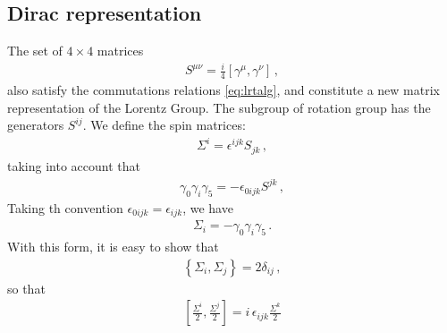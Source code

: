 \begin{inprogress}
  \subsection{Dirac representation}
The set of $4\times 4$ matrices
\begin{align}
  S^{\mu\nu}=\frac{i}{4}\left[\gamma^\mu,\gamma^\nu\right]\,,
\end{align}
also satisfy the commutations relations \eqref{eq:lrtalg}, and constitute a new matrix representation of the Lorentz Group. The subgroup of rotation group has the generators $S^{ij}$. We define the spin matrices:
\begin{align}
  \Sigma^i=\epsilon^{ijk}S_{jk}\,,
\end{align}
taking into account that
\begin{align}
  \gamma_0\gamma_i\gamma_5=-\epsilon_{0ijk}S^{jk}\,,
\end{align}
Taking th convention $\epsilon_{0ijk}=\epsilon_{ijk}$, we have
\begin{align}
  \Sigma_{i}=-\gamma_0\gamma_i\gamma_5\,.
\end{align}
With this form, it is easy to show that
\begin{align}
  \left\{\Sigma_i,\Sigma_j\right\}=2\delta_{ij}\,, 
\end{align}
so that 
\begin{align}
  \left[\frac{\Sigma^i}{2},\frac{\Sigma^j}{2} \right]=i\,\epsilon_{ijk}\frac{\Sigma^k}{2}
\end{align}
\end{inprogress}


